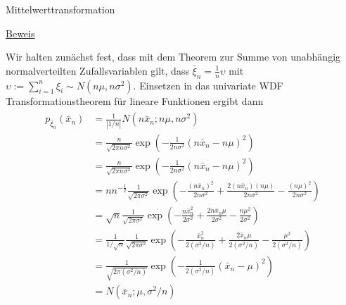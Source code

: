 \documentclass[
  8pt,
  ignorenonframetext,
]{beamer}
\newcommand{\ups}{\upsilon}
\begin{document}
\begin{frame}{Mittelwerttransformation}
\protect\hypertarget{mittelwerttransformation-2}{}
\vspace{2mm}
\footnotesize

\underline{Beweis}  \tiny

Wir halten zunächst fest, dass mit dem Theorem zur Summe von unabhängig
normalverteilten Zufallsvariablen gilt, dass
\(\bar{\xi}_n = \frac{1}{n}\ups\) mit
\(\ups := \sum_{i=1}^n \xi_i \sim N(n\mu,n\sigma^2)\). Einsetzen in das
univariate WDF Transformationstheorem für lineare Funktionen ergibt dann
\begin{align}
\begin{split}
p_{\bar{\xi}_n}(\bar{x}_n)
& = \frac{1}{|1/n|}N\left(n\bar{x}_n; n\mu , n\sigma^2 \right) \\
& = \frac{n}{\sqrt{2\pi n\sigma^2}}\exp\left(-\frac{1}{2n\sigma^2}
\left(n\bar{x}_n - n\mu\right)^2 \right) \\
& = \frac{n}{\sqrt{2\pi n\sigma^2}}\exp\left(-\frac{1}{2n\sigma^2}
\left(n\bar{x}_n - n\mu\right)^2 \right) \\
& = nn^{-\frac{1}{2}}\frac{1}{\sqrt{2\pi\sigma^2}}
\exp\left(
            -\frac{(n\bar{x}_n)^2}{2n\sigma^2}
            + \frac{2(n\bar{x}_n)(n\mu)}{2n\sigma^2}
            - \frac{(n\mu)^2}{2n\sigma^2}
         \right) \\
& = \sqrt{n}\frac{1}{\sqrt{2\pi\sigma^2}}
\exp\left(
            -\frac{n\bar{x}_n^2}{2\sigma^2}
            + \frac{2n\bar{x}_n\mu}{2\sigma^2}
            - \frac{n\mu^2}{2\sigma^2}
         \right) \\
& = \frac{1}{1/\sqrt{n}}\frac{1}{\sqrt{2\pi\sigma^2}}
\exp\left(
            -\frac{\bar{x}_n^2}{2(\sigma^2/n)}
            + \frac{2\bar{x}_n\mu}{2(\sigma^2/n)}
            - \frac{\mu^2}{2(\sigma^2/n)}
         \right) \\
& = \frac{1}{\sqrt{2\pi(\sigma^2/n)}}
\exp\left(-\frac{1}{2(\sigma^2/n)}
            (\bar{x}_n - \mu)^2
         \right) \\
& = N\left(\bar{x}_n;\mu,\sigma^2/n \right)
\end{split}
\end{align}
\end{frame}
\end{document}
